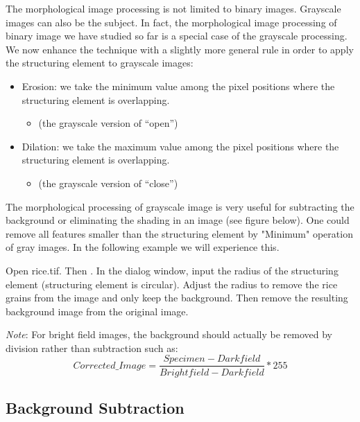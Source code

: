 The morphological image processing is not limited to binary images. Grayscale images can also be the subject. In fact, the morphological image processing of binary image we have studied so far is a special case of the grayscale processing. We now enhance the technique with a slightly more general rule in order to apply the structuring element to grayscale images: 
\begin{itemize}
\item Erosion: we take the minimum value among the pixel positions where the structuring element is overlapping.   
\begin{itemize}
\item {} (the grayscale version of ``open'')
\end{itemize}
\item Dilation: we take the maximum value among the pixel positions where the structuring element is overlapping. 
\begin{itemize}
\item {} (the grayscale version of ``close'')
\end{itemize}
\end{itemize}

The morphological processing of grayscale image is very useful for
subtracting the background or eliminating the shading in an
image (see figure below). One could remove all features smaller than
the structuring element by "Minimum"
operation of gray images. In the following example we will experience
this.

\begin{indentexercise}{1}
\label{exer:removerice}
Open rice.tif. Then . In the dialog
window, input the radius of the structuring element (structuring
element is circular). Adjust the radius to remove the rice grains from the image and only keep the background. Then remove the
resulting background image from the original image. 

\textit{Note}: For bright field images, the background should actually be removed by division rather than subtraction such as: 
\[
Corrected\_Image = \frac{Specimen - Darkfield}{Brightfield - Darkfield} * 255
\]
\end{indentexercise}



\subsection{Background Subtraction}

